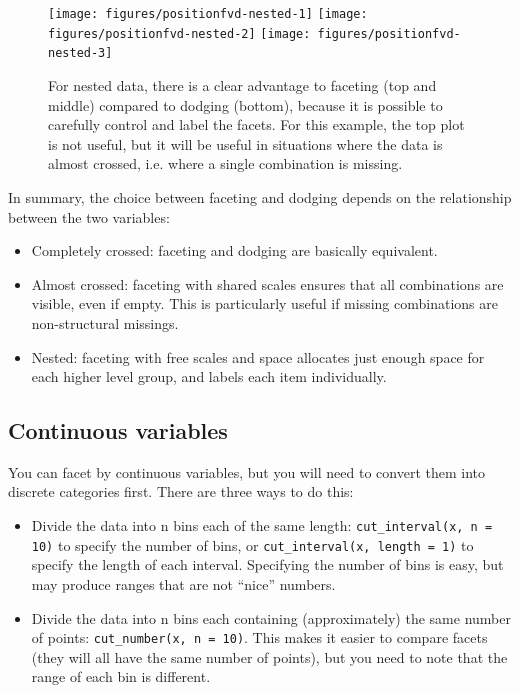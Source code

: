 \begin{figure}

{\centering \texttt{[image: figures/positionfvd-nested-1]} \texttt{[image: figures/positionfvd-nested-2]} \texttt{[image: figures/positionfvd-nested-3]} 

}

\caption{For nested data, there is a clear advantage to faceting (top and middle) compared to dodging (bottom), because it is possible to carefully control and label the facets.  For this example, the top plot is not useful, but it will be useful in situations where the data is almost crossed, i.e. where a single combination is missing.\label{fig:fvd-nested}}
\end{figure}

In summary, the choice between faceting and dodging depends on the
relationship between the two variables:

\begin{itemize}
\itemsep1pt\parskip0pt
\item
  Completely crossed: faceting and dodging are basically equivalent.
\item
  Almost crossed: faceting with shared scales ensures that all
  combinations are visible, even if empty. This is particularly useful
  if missing combinations are non-structural missings.
\item
  Nested: faceting with free scales and space allocates just enough
  space for each higher level group, and labels each item individually.
\end{itemize}

\subsection{Continuous variables}\label{sub:continuous-variables}

You can facet by continuous variables, but you will need to convert them
into discrete categories first. There are three ways to do this:

\begin{itemize}
\itemsep1pt\parskip0pt
\item
  Divide the data into n bins each of the same length:
  \texttt{cut\_interval(x, n = 10)} to specify the number of bins, or
  \texttt{cut\_interval(x, length = 1)} to specify the length of each
  interval. Specifying the number of bins is easy, but may produce
  ranges that are not ``nice'' numbers. 
\item
  Divide the data into n bins each containing (approximately) the same
  number of points: \texttt{cut\_number(x, n = 10)}. This makes it
  easier to compare facets (they will all have the same number of
  points), but you need to note that the range of each bin is different.
\end{itemize}

